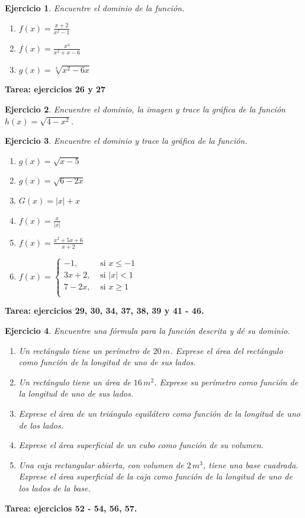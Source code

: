 \documentclass[12pt,tikz,border=5pt]{article}
\newtheorem{ejercicio}{Ejercicio}[section]
\begin{document}
\begin{ejercicio}
  Encuentre el dominio de la función.
  \begin{enumerate}[label=(\alph*)]
    \item $f(x) = \frac{x+2}{x^{2} - 1}$
    \item $f(x) = \frac{x^4}{x^2+x-6}$
    \item $g(x) = \sqrt[4]{x^2 - 6x}$
  \end{enumerate}
\end{ejercicio}

\textbf{Tarea: ejercicios 26 y 27}

\begin{ejercicio}
  Encuentre el dominio, la imagen y trace la gráfica de la función $h(x) = \sqrt{4 - x^2}$.
\end{ejercicio}

\begin{ejercicio}
  Encuentre el dominio y trace la gráfica de la función.
  \begin{enumerate}[label=(\alph*)]
    \item $g(x) = \sqrt{x - 5}$
    \item $g(x) = \sqrt{6 - 2x}$
    \item $G(x) = |x| + x$
    \item $f(x) = \frac{x}{|x|}$
    \item $f(x) = \frac{x^2 + 5x + 6}{x + 2}$
    \item $f(x) = 
      \begin{cases}
        -1, &\text{ si } x \leq -1\\
        3x + 2, &\text{ si } |x| < 1\\
        7 - 2x, &\text{ si } x \geq 1\\
      \end{cases}$
  \end{enumerate}
\end{ejercicio}

\textbf{Tarea: ejercicios 29, 30, 34, 37, 38, 39 y 41 - 46.}

\begin{ejercicio}
  Encuentre una fórmula para la función descrita y dé su dominio. 
  \begin{enumerate}[label=(\alph*)]
    \item Un rectángulo tiene un perímetro de $20\,m$. Exprese el área del rectángulo como función de la longitud de uno de sus lados.
    \item Un rectángulo tiene un área de $16\,m^2$. Exprese su perímetro como función de la longitud de uno de sus lados.
    \item Exprese el área de un triángulo equilátero como función de la longitud de uno de los lados.
    \item Exprese el área superficial de un cubo como función de su volumen.
    \item Una caja rectangular abierta, con volumen de $2\,m^3$, tiene una base cuadrada. Exprese el área superficial de la caja como función de la longitud de uno de los lados de la base.
  \end{enumerate}
\end{ejercicio}
\textbf{Tarea: ejercicios 52 - 54, 56, 57.}



\end{document}
